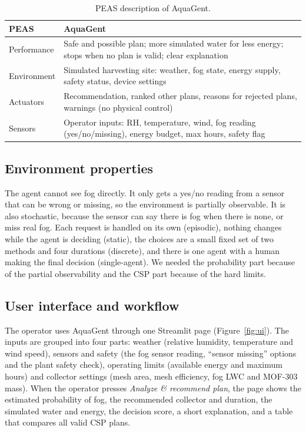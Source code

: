 \documentclass[11pt]{article}
\begin{document}
\begin{table}[h]
\centering
\small
\begin{tabularx}{\columnwidth}{@{}p{1.75cm}X@{}}
\toprule
\textbf{PEAS} & \textbf{AquaGent} \\
\midrule
Performance & Safe and possible plan; more simulated water for less energy; stops when no plan is valid; clear explanation \\
Environment & Simulated harvesting site: weather, fog state, energy supply, safety status, device settings \\
Actuators & Recommendation, ranked other plans, reasons for rejected plans, warnings (no physical control) \\
Sensors & Operator inputs: RH, temperature, wind, fog reading (yes/no/missing), energy budget, max hours, safety flag \\
\bottomrule
\end{tabularx}
\caption{PEAS description of AquaGent.}
\label{tab:peas}
\end{table}

\subsection{Environment properties}
The agent cannot see fog directly. It only gets a yes/no reading from a sensor that can be wrong or missing, so the environment is partially observable. It is also stochastic, because the sensor can say there is fog when there is none, or miss real fog. Each request is handled on its own (episodic), nothing changes while the agent is deciding (static), the choices are a small fixed set of two methods and four durations (discrete), and there is one agent with a human making the final decision (single-agent). We needed the probability part because of the partial observability and the CSP part because of the hard limits.

\subsection{User interface and workflow}
\label{sec:ui}
The operator uses AquaGent through one Streamlit page (Figure~\ref{fig:ui}). The inputs are grouped into four parts: weather (relative humidity, temperature and wind speed), sensors and safety (the fog sensor reading, ``sensor missing'' options and the plant safety check), operating limits (available energy and maximum hours) and collector settings (mesh area, mesh efficiency, fog LWC and MOF-303 mass). When the operator presses \emph{Analyze \& recommend plan}, the page shows the estimated probability of fog, the recommended collector and duration, the simulated water and energy, the decision score, a short explanation, and a table that compares all valid CSP plans.
\end{document}
